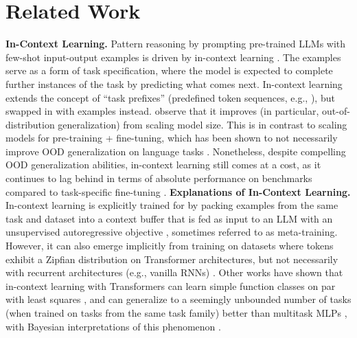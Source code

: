 \documentclass{article}
\newcommand{\eg}{e.g., }
\begin{document}
\section{Related Work}
\label{sec:related_work}
\textbf{In-Context Learning.} Pattern reasoning by prompting pre-trained LLMs with few-shot input-output examples is driven by in-context learning \cite{radford2019language,brown2020language}. The examples serve as a form of task specification, where the model is expected to complete further instances of the task by predicting what comes next. In-context learning extends the concept of ``task prefixes'' (predefined token sequences, \eg \cite{raffel2020exploring}), but swapped in with examples instead. \citet{brown2020language} observe that it improves (in particular, out-of-distribution generalization) from scaling model size. This is in contrast to scaling models for pre-training + fine-tuning, which has been shown to not necessarily improve OOD generalization on language tasks \cite{hendrycks2020pretrained}. Nonetheless, despite compelling OOD generalization abilities, in-context learning still comes at a cost, as it continues to lag behind in terms of absolute performance on benchmarks compared to task-specific fine-tuning \cite{radford2019language, dinh2022lift}.
\textbf{Explanations of In-Context Learning.} In-context learning is explicitly trained for by packing examples from the same task and dataset into a context buffer that is fed as input to an LLM with an unsupervised autoregressive objective \cite{brown2020language}, sometimes referred to as meta-training. However, it can also emerge implicitly from training on datasets where tokens exhibit a Zipfian distribution \cite{chan2022data} on Transformer architectures, but not necessarily with recurrent architectures (\eg vanilla RNNs) \cite{chan2022data}. Other works have shown that in-context learning with Transformers can learn simple function classes on par with least squares \cite{garg2022can,akyurek2022learning,von2023transformers}, and can generalize to a seemingly unbounded number of tasks (when trained on tasks from the same task family) better than multitask MLPs \cite{kirsch2022general}, with Bayesian interpretations of this phenomenon \cite{xie2021explanation} \cite{wang2023large}.
\end{document}

